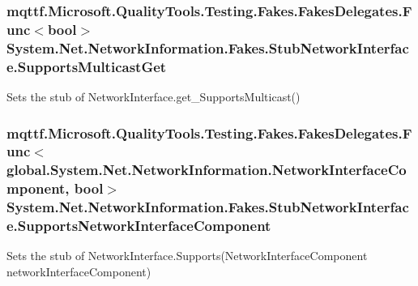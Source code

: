 \hypertarget{class_system_1_1_net_1_1_network_information_1_1_fakes_1_1_stub_network_interface_ac599cef6fe7c600e6d16f09cd5274e17}{
\subsubsection[{Supports\-Multicast\-Get}]{\setlength{\rightskip}{0pt plus 5cm}mqttf.\-Microsoft.\-Quality\-Tools.\-Testing.\-Fakes.\-Fakes\-Delegates.\-Func$<$bool$>$ System.\-Net.\-Network\-Information.\-Fakes.\-Stub\-Network\-Interface.\-Supports\-Multicast\-Get}}\label{class_system_1_1_net_1_1_network_information_1_1_fakes_1_1_stub_network_interface_ac599cef6fe7c600e6d16f09cd5274e17}


Sets the stub of Network\-Interface.\-get\-\_\-\-Supports\-Multicast()

\hypertarget{class_system_1_1_net_1_1_network_information_1_1_fakes_1_1_stub_network_interface_a3a4b6014c338184527c9789f767efca3}{
\subsubsection[{Supports\-Network\-Interface\-Component}]{\setlength{\rightskip}{0pt plus 5cm}mqttf.\-Microsoft.\-Quality\-Tools.\-Testing.\-Fakes.\-Fakes\-Delegates.\-Func$<$global.\-System.\-Net.\-Network\-Information.\-Network\-Interface\-Component, bool$>$ System.\-Net.\-Network\-Information.\-Fakes.\-Stub\-Network\-Interface.\-Supports\-Network\-Interface\-Component}}\label{class_system_1_1_net_1_1_network_information_1_1_fakes_1_1_stub_network_interface_a3a4b6014c338184527c9789f767efca3}


Sets the stub of Network\-Interface.\-Supports(\-Network\-Interface\-Component network\-Interface\-Component)




